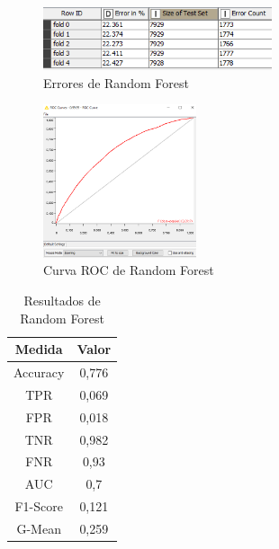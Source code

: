 	\begin{figure}[htb]
		\centering
		\includegraphics[width=0.6\textwidth]{./imagenes/15}
		\caption{Errores de Random Forest} \label{fig:2}
	\end{figure}

	\begin{figure}[htb]
		\centering
		\includegraphics[width=0.4\textwidth]{./imagenes/16}
		\caption{Curva ROC de Random Forest} \label{fig:1}
	\end{figure}

	\begin{table}[htbp]
		\begin{center}
			\begin{tabular}{|c|c|}
				\hline
				Medida & Valor \\
				\hline \hline
				Accuracy & 0,776 \\
				\hline
				TPR &  0,069 \\
				\hline
				FPR &  0,018 \\
				\hline
				TNR &  0,982 \\
				\hline
				FNR &  0,93 \\
				\hline
				AUC &  0,7 \\
				\hline
				F1-Score & 0,121 \\
				\hline	
				G-Mean & 0,259 \\
				\hline
			\end{tabular}
			\caption{Resultados de Random Forest}
			\label{tabla:sencilla}
		\end{center}
	\end{table}



